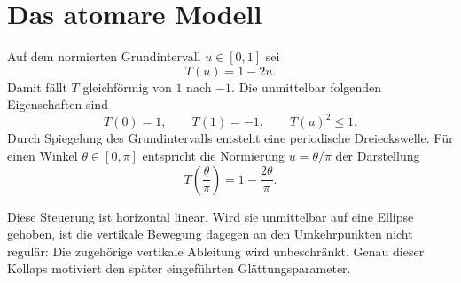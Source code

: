 \section{Das atomare Modell}

Auf dem normierten Grundintervall $u\in[0,1]$ sei
\[
  T(u)=1-2u.
\]
Damit fällt $T$ gleichförmig von $1$ nach $-1$. Die unmittelbar folgenden
Eigenschaften sind
\[
  T(0)=1,
  \qquad
  T(1)=-1,
  \qquad
  T(u)^2\leq 1.
\]
Durch Spiegelung des Grundintervalls entsteht eine periodische Dreieckswelle.
Für einen Winkel $\theta\in[0,\pi]$ entspricht die Normierung
$u=\theta/\pi$ der Darstellung
\[
  T\!\left(\frac{\theta}{\pi}\right)
  =1-\frac{2\theta}{\pi}.
\]

Diese Steuerung ist horizontal linear. Wird sie unmittelbar auf eine Ellipse
gehoben, ist die vertikale Bewegung dagegen an den Umkehrpunkten nicht regulär:
Die zugehörige vertikale Ableitung wird unbeschränkt. Genau dieser Kollaps
motiviert den später eingeführten Glättungsparameter.
